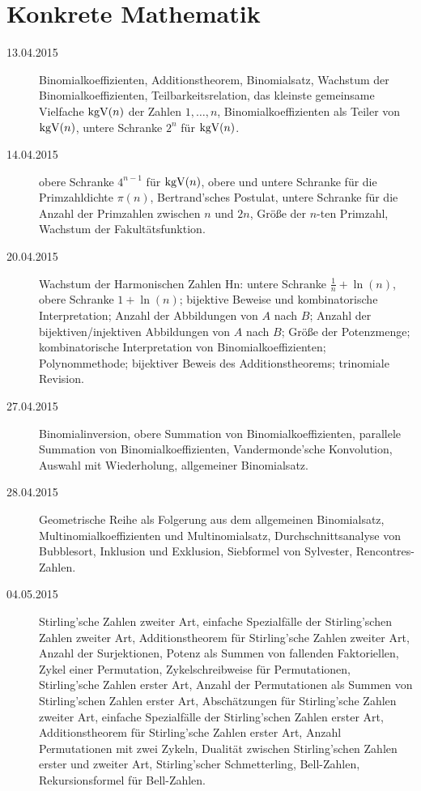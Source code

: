 \documentclass{mywork}
\begin{document}
\pagestyle{plain}

\section*{Konkrete Mathematik}


\begin{description}
    \item[13.04.2015]
        Binomialkoeffizienten, Additionstheorem, Binomialsatz, Wachstum der Binomialkoeffizienten, Teilbarkeitsrelation, das kleinste gemeinsame Vielfache $\operatorname{kgV}(n)$ der Zahlen $1,\dotsc,n$, Binomialkoeffizienten als Teiler von $\operatorname{kgV}(n)$, untere Schranke $2^n$ für $\operatorname{kgV}(n)$.
    \item[14.04.2015]
        obere Schranke $4^{n-1}$ für $\operatorname{kgV}(n)$, obere und untere Schranke für die Primzahldichte $π(n)$, Bertrand'sches Postulat, untere Schranke für die Anzahl der Primzahlen zwischen $n$ und $2n$, Größe der $n$-ten Primzahl, Wachstum der Fakultätsfunktion.
    \item[20.04.2015]
        Wachstum der Harmonischen Zahlen Hn: untere Schranke $\frac{1}{n}+\ln(n)$, obere Schranke $1+\ln(n)$; bijektive Beweise und kombinatorische Interpretation; Anzahl der Abbildungen von $A$ nach $B$; Anzahl der bijektiven/injektiven Abbildungen von $A$ nach $B$; Größe der Potenzmenge; kombinatorische Interpretation von Binomialkoeffizienten; Polynommethode; bijektiver Beweis des Additionstheorems; trinomiale Revision.
    \item[27.04.2015]
        Binomialinversion, obere Summation von Binomialkoeffizienten, parallele Summation von Binomialkoeffizienten, Vandermonde'sche Konvolution, Auswahl mit Wiederholung, allgemeiner Binomialsatz.
    \item[28.04.2015]
        Geometrische Reihe als Folgerung aus dem allgemeinen Binomialsatz, Multinomialkoeffizienten und Multinomialsatz, Durchschnittsanalyse von Bubblesort, Inklusion und Exklusion, Siebformel von Sylvester, Rencontres-Zahlen.
    \item[04.05.2015]
        Stirling'sche Zahlen zweiter Art, einfache Spezialfälle der Stirling'schen Zahlen zweiter Art, Additionstheorem für Stirling'sche Zahlen zweiter Art, Anzahl der Surjektionen, Potenz als Summen von fallenden Faktoriellen, Zykel einer Permutation, Zykelschreibweise für Permutationen, Stirling'sche Zahlen erster Art, Anzahl der Permutationen als Summen von Stirling'schen Zahlen erster Art, Abschätzungen für Stirling'sche Zahlen zweiter Art, einfache Spezialfälle der Stirling'schen Zahlen erster Art, Additionstheorem für Stirling'sche Zahlen erster Art, Anzahl Permutationen mit zwei Zykeln, Dualität zwischen Stirling'schen Zahlen erster und zweiter Art, Stirling'scher Schmetterling, Bell-Zahlen, Rekursionsformel für Bell-Zahlen.

\end{description}
\end{document}
